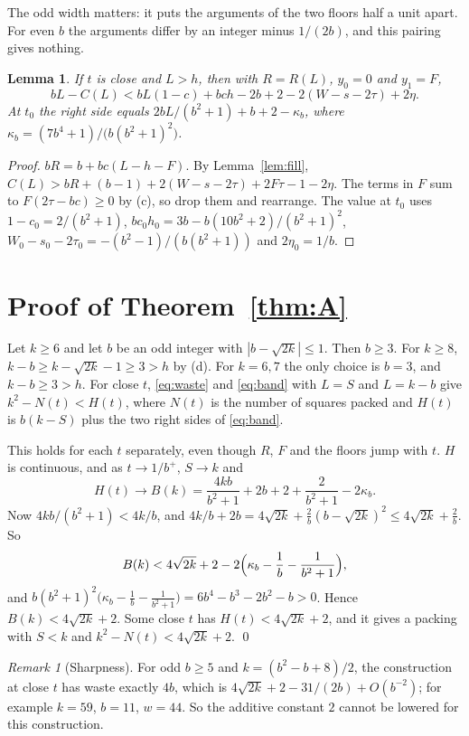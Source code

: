 \documentclass[11pt,letterpaper]{amsart}
\theoremstyle{plain}
\newtheorem{lemma}[theorem]{Lemma}
\theoremstyle{remark}
\newtheorem*{remark}{Remark}
\begin{document}
The odd width matters: it puts the arguments of the two floors half a unit apart. For even $b$ the arguments differ by an integer minus $1/(2b)$, and this pairing gives nothing.

\begin{lemma}\label{lem:band}
If $t$ is close and $L>h$, then with $R=R(L)$, $y_0=0$ and $y_1=F$,
\begin{equation}\label{eq:band}
bL-C(L)<bL(1-c)+bch-2b+2-2(W-s-2\tau)+2\eta.
\end{equation}
At $t_0$ the right side equals $2bL/(b^2+1)+b+2-\kappa_b$, where $\kappa_b=(7b^4+1)/\bigl(b(b^2+1)^2\bigr)$.
\end{lemma}

\begin{proof}
$bR=b+bc(L-h-F)$. By Lemma~\ref{lem:fill}, $C(L)>bR+(b-1)+2(W-s-2\tau)+2F\tau-1-2\eta$. The terms in $F$ sum to $F(2\tau-bc)\ge0$ by (c), so drop them and rearrange. The value at $t_0$ uses $1-c_0=2/(b^2+1)$, $bc_0h_0=3b-b(10b^2+2)/(b^2+1)^2$, $W_0-s_0-2\tau_0=-(b^2-1)/(b(b^2+1))$ and $2\eta_0=1/b$.
\end{proof}

\section{Proof of Theorem~\ref{thm:A}}

Let $k\ge6$ and let $b$ be an odd integer with $|b-\sqrt{2k}|\le1$. Then $b\ge3$. For $k\ge8$, $k-b\ge k-\sqrt{2k}-1\ge3>h$ by (d). For $k=6,7$ the only choice is $b=3$, and $k-b\ge3>h$. For close $t$, \eqref{eq:waste} and \eqref{eq:band} with $L=S$ and $L=k-b$ give $k^2-N(t)<H(t)$, where $N(t)$ is the number of squares packed and $H(t)$ is $b(k-S)$ plus the two right sides of \eqref{eq:band}.

This holds for each $t$ separately, even though $R$, $F$ and the floors jump with $t$. $H$ is continuous, and as $t\to1/b^+$, $S\to k$ and
\[
H(t)\to B(k)=\frac{4kb}{b^2+1}+2b+2+\frac{2}{b^2+1}-2\kappa_b.
\]
Now $4kb/(b^2+1)<4k/b$, and $4k/b+2b=4\sqrt{2k}+\frac2b(b-\sqrt{2k})^2\le4\sqrt{2k}+\frac2b$. So
\[
B(k)<4\sqrt{2k}+2-2\Bigl(\kappa_b-\frac1b-\frac1{b^2+1}\Bigr),
\]
and $b(b^2+1)^2\bigl(\kappa_b-\frac1b-\frac1{b^2+1}\bigr)=6b^4-b^3-2b^2-b>0$. Hence $B(k)<4\sqrt{2k}+2$. Some close $t$ has $H(t)<4\sqrt{2k}+2$, and it gives a packing with $S<k$ and $k^2-N(t)<4\sqrt{2k}+2$. \qed

\begin{remark}[Sharpness]
For odd $b\ge5$ and $k=(b^2-b+8)/2$, the construction at close $t$ has waste exactly $4b$, which is $4\sqrt{2k}+2-31/(2b)+O(b^{-2})$; for example $k=59$, $b=11$, $w=44$. So the additive constant $2$ cannot be lowered for this construction.
\end{remark}
\end{document}
